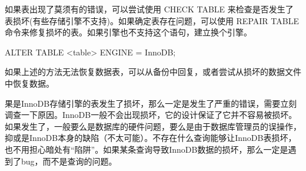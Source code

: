 如果表出现了莫须有的错误，可以尝试使用 CHECK TABLE 来检查是否发生了表损坏(有些存储引擎不支持)。如果确定表存在问题，可以使用 REPAIR TABLE 命令来修复损坏的表。如果引擎也不支持这个语句，建立换个引擎。

\begin{sql}
ALTER TABLE <table> ENGINE = InnoDB;
\end{sql}

如果上述的方法无法恢复数据表，可以从备份中回复，或者尝试从损坏的数据文件中恢复数据。

果是InnoDB存储引擎的表发生了损坏，那么一定是发生了严重的错误，需要立刻调查一下原因。InnoDB一般不会出现损坏，它的设计保证了它并不容易被损坏。如果发生了，一般要么是数据库的硬件问题，要么是由于数据库管理员的误操作，抑或是InnoDB本身的缺陷（不太可能）。不存在什么查询能够让InnoDB表损坏，也不用担心暗处有“陷阱”。如果某条查询导致InnoDB数据的损坏，那么一定是遇到了bug，而不是查询的问题。
